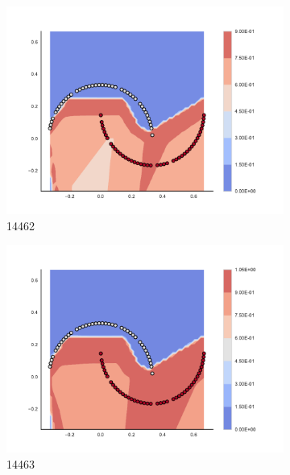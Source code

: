 \begin{figure}[h]
\begin{subfigure}[b]{0.09\textwidth}
    \includegraphics[clip, trim=2.35cm 1.75cm 4.5cm 0cm,width=\textwidth]{img/convergence/14462.pdf}
    \caption{14462}
    \label{fig:convergence_14462}
\end{subfigure}
%
\begin{subfigure}[b]{0.09\textwidth}
    \includegraphics[clip, trim=2.35cm 1.75cm 4.5cm 0cm,width=\textwidth]{img/convergence/14463.pdf}
    \caption{14463}
    \label{fig:convergence_14463}
\end{subfigure}
%
\begin{subfigure}[b]{0.09\textwidth}

\end{subfigure}
\end{figure}
